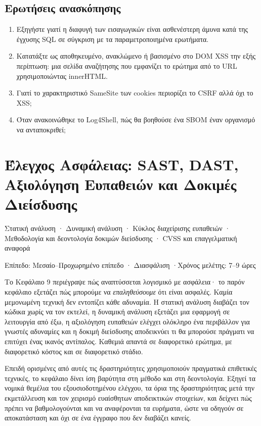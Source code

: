 \documentclass[11pt,openany]{book}
\newcommand{\chaptermeta}[3]{%
  {\sffamily\small\color{accent}#1\par}\vspace{0.3em}
  {\sffamily\footnotesize\color{gray}#2 \quad·\quad #3\par}\vspace{1.2em}}
\begin{document}
\section*{Ερωτήσεις ανασκόπησης}
\begin{enumerate}
  \item Εξηγήστε γιατί η διαφυγή των εισαγωγικών είναι ασθενέστερη άμυνα κατά της έγχυσης SQL σε σύγκριση με τα παραμετροποιημένα ερωτήματα.
  \item Κατατάξτε ως αποθηκευμένο, ανακλώμενο ή βασισμένο στο DOM XSS την εξής περίπτωση: μια σελίδα αναζήτησης που εμφανίζει το ερώτημα από το URL χρησιμοποιώντας innerHTML.
  \item Γιατί το χαρακτηριστικό SameSite των cookies περιορίζει το CSRF αλλά όχι το XSS;
  \item Όταν ανακοινώθηκε το Log4Shell, πώς θα βοηθούσε ένα SBOM έναν οργανισμό να ανταποκριθεί;
\end{enumerate}

\chapter{Έλεγχος Ασφάλειας: SAST, DAST, Αξιολόγηση Ευπαθειών και Δοκιμές Διείσδυσης}\label{ch:10}
\chaptermeta{Στατική ανάλυση · Δυναμική ανάλυση · Κύκλος διαχείρισης ευπαθειών · Μεθοδολογία και δεοντολογία δοκιμών διείσδυσης · CVSS και επαγγελματική αναφορά}{Επίπεδο: Μεσαίο–Προχωρημένο επίπεδο · Διασφάλιση}{Χρόνος μελέτης: 7–9 ώρες}

Το Κεφάλαιο 9 περιέγραψε πώς αναπτύσσεται λογισμικό με ασφάλεια· το παρόν κεφάλαιο εξετάζει πώς μπορούμε να \emph{επαληθεύσουμε} ότι είναι ασφαλές. Καμία μεμονωμένη τεχνική δεν εντοπίζει κάθε αδυναμία. Η στατική ανάλυση διαβάζει τον κώδικα χωρίς να τον εκτελεί, η δυναμική ανάλυση εξετάζει μια εφαρμογή σε λειτουργία από έξω, η αξιολόγηση ευπαθειών ελέγχει ολόκληρο ένα περιβάλλον για γνωστές αδυναμίες και η δοκιμή διείσδυσης αποδεικνύει τι θα μπορούσε πράγματι να επιτύχει ένας ικανός αντίπαλος. Καθεμιά απαντά σε διαφορετικό ερώτημα, με διαφορετικό κόστος και σε διαφορετικό στάδιο.

Επειδή ορισμένες από αυτές τις δραστηριότητες χρησιμοποιούν πραγματικά επιθετικές τεχνικές, το κεφάλαιο δίνει ίση βαρύτητα στη μέθοδο και στη δεοντολογία. Εξηγεί τα νομικά θεμέλια του εξουσιοδοτημένου ελέγχου, τα όρια της δραστηριότητας μετά την εκμετάλλευση και τον χειρισμό ευαίσθητων αποδεικτικών στοιχείων, και δείχνει πώς πρέπει να βαθμολογούνται και να αναφέρονται τα ευρήματα, ώστε να οδηγούν σε αποκατάσταση και όχι σε ένα έγγραφο που δεν διαβάζει κανείς.
\end{document}
